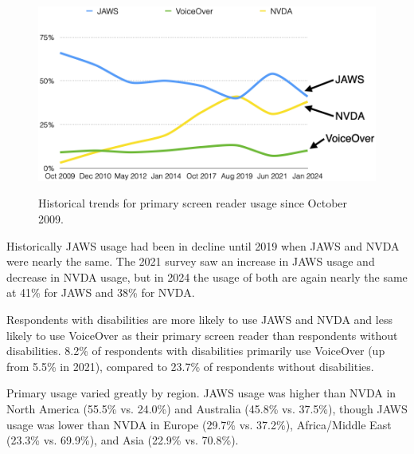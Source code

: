 \begin{figure}[htbp]
\centering
{}
\includegraphics[alt={This line chart presents the percentage of survey respondents identifying each screen reader as their primary choice from 2009 to 2024. JAWS and NVDA show alternating dominance, with JAWS leading early and NVDA increasing steadily. VoiceOver maintains a smaller but consistent share. The chart highlights shifts in user preference and the emergence of new screen readers over time.}]{images/SR-1.png}
\caption{Historical trends for primary screen reader usage since October 2009.}
\label{fig:sr1}
\tagstructend
\end{figure}

Historically JAWS usage had been in decline until 2019 when JAWS and NVDA were nearly the same. The 2021 survey saw an increase in JAWS usage and decrease in NVDA usage, but in 2024 the usage of both are again nearly the same at 41\% for JAWS and 38\% for NVDA.

Respondents with disabilities are more likely to use JAWS and NVDA and less likely to use VoiceOver as their primary screen reader than respondents without disabilities. 8.2\% of respondents with disabilities primarily use VoiceOver (up from 5.5\% in 2021), compared to 23.7\% of respondents without disabilities.

Primary usage varied greatly by region. JAWS usage was higher than NVDA in North America (55.5\% vs. 24.0\%) and Australia (45.8\% vs. 37.5\%), though JAWS usage was lower than NVDA in Europe (29.7\% vs. 37.2\%), Africa/Middle East (23.3\% vs. 69.9\%), and Asia (22.9\% vs. 70.8\%).

